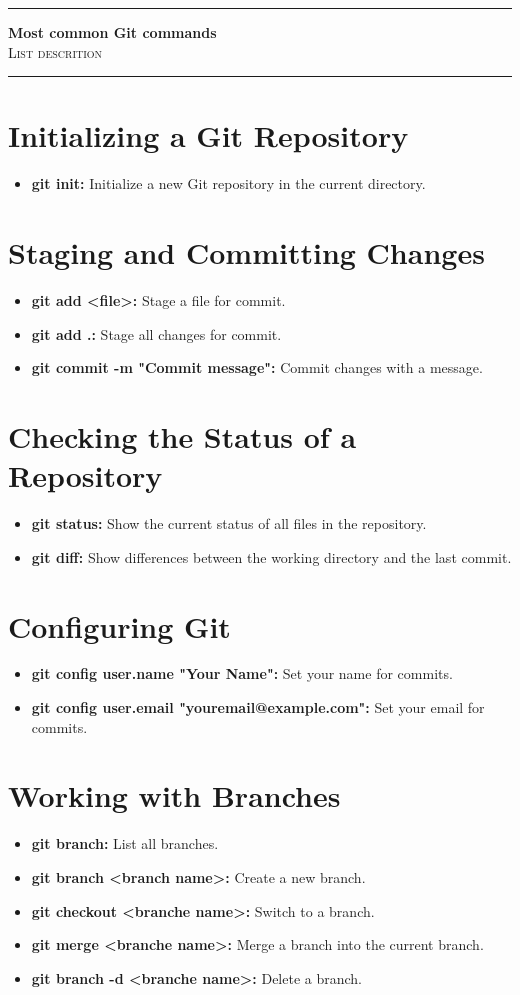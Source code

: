 \documentclass[a4paper, 11pt]{article}
\numberwithin{equation}{section}
\theoremstyle{definition}
\theoremstyle{remark}
\newcommand{\entete}
{
  \hrule
  \begin{center} \textbf{\Large Most common Git commands} \\ \textsc{List descrition} \end{center}
  \hrule
  \vspace*{0.3cm}
}
\begin{document}
\entete

\section{Initializing a Git Repository}
\begin{itemize}[label=$\bullet$]
    \item \textbf{git init:} Initialize a new Git repository in the current directory.
\end{itemize}

\section{Staging and Committing Changes}
\begin{itemize}[label=$\bullet$]
    \item \textbf{git add <file>:} Stage a file for commit.
    \item \textbf{git add .:} Stage all changes for commit.
    \item \textbf{git commit -m "Commit message":} Commit changes with a message.
\end{itemize}

\section{Checking the Status of a Repository}
\begin{itemize}[label=$\bullet$]
    \item \textbf{git status:} Show the current status of all files in the repository.
    \item \textbf{git diff:} Show differences between the working directory and the last commit.
\end{itemize}

\section{Configuring Git}
\begin{itemize}[label=$\bullet$]
    \item \textbf{git config user.name "Your Name":} Set your name for commits.
    \item \textbf{git config user.email "youremail@example.com":} Set your email for commits.
\end{itemize}

\section{Working with Branches}
\begin{itemize}[label=$\bullet$]
    \item \textbf{git branch:} List all branches.
    \item \textbf{git branch <branch name>:} Create a new branch.
    \item \textbf{git checkout <branche name>:} Switch to a branch.
    \item \textbf{git merge <branche name>:} Merge a branch into the current branch.
    \item \textbf{git branch -d <branche name>:} Delete a branch.
\end{itemize}
\end{document}
